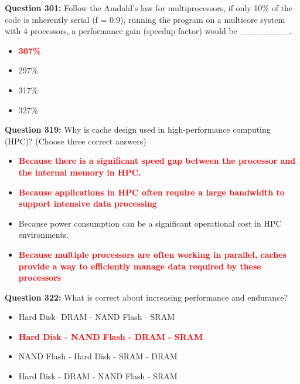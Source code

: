 \documentclass[12pt,a4paper]{article}
\begin{document}
\vspace{0.5cm}

\textbf{Question 301:} Follow the Amdahl's law for multiprocessors, if only 10\% of the code is inherently serial (f = 0.9), running the program on a multicore system with 4 processors, a performance gain (speedup factor) would be ________.

\begin{itemize}
    \item[\textbf{A.}] \textcolor{red}{\textbf{307\%}}
    \item[\textbf{B.}] 297\%
    \item[\textbf{C.}] 317\%
    \item[\textbf{D.}] 327\%
\end{itemize}

\vspace{0.5cm}

\textbf{Question 319:} Why is cache design used in high-performance computing (HPC)? (Choose three correct answers)

\begin{itemize}
    \item[\textbf{A.}] \textcolor{red}{\textbf{Because there is a significant speed gap between the processor and the internal memory in HPC.}}
    \item[\textbf{B.}] \textcolor{red}{\textbf{Because applications in HPC often require a large bandwidth to support intensive data processing}}
    \item[\textbf{C.}] Because power consumption can be a significant operational cost in HPC environments.
    \item[\textbf{D.}] \textcolor{red}{\textbf{Because multiple processors are often working in parallel, caches provide a way to efficiently manage data required by these processors}}
\end{itemize}

\vspace{0.5cm}

\textbf{Question 322:} What is correct about increasing performance and endurance?

\begin{itemize}
    \item[\textbf{A.}] Hard Disk- DRAM - NAND Flash - SRAM
    \item[\textbf{B.}] \textcolor{red}{\textbf{Hard Disk - NAND Flash - DRAM - SRAM}}
    \item[\textbf{C.}] NAND Flash - Hard Disk - SRAM - DRAM
    \item[\textbf{D.}] Hard Disk - DRAM - NAND Flash - SRAM
\end{itemize}
\end{document}
